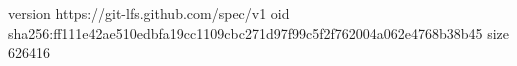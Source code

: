 version https://git-lfs.github.com/spec/v1
oid sha256:ff111e42ae510edbfa19cc1109cbc271d97f99c5f2f762004a062e4768b38b45
size 626416
